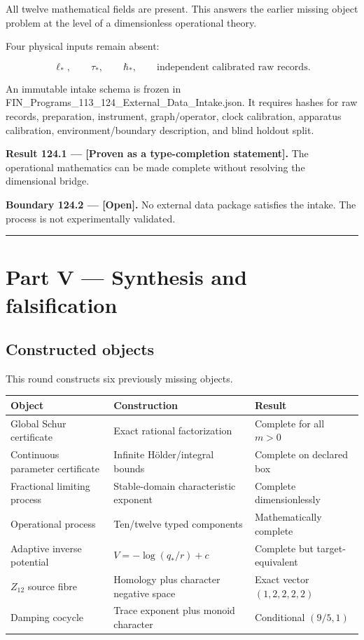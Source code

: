 \documentclass[11pt,a4paper,openany]{report}
\newcommand{\statusOpen}{\textcolor{finviolet}{[Open]}}
\begin{document}
All twelve mathematical fields are present. This answers the earlier missing object problem at the level of a dimensionless operational theory.

Four physical inputs remain absent:

\[
\ell_*,
\qquad
\tau_*,
\qquad
\hbar_*,
\qquad
\text{independent calibrated raw records}.
\]

An immutable intake schema is frozen in FIN\_Programs\_113\_124\_External\_Data\_Intake.json. It requires hashes for raw records, preparation, instrument, graph/\allowbreak{}operator, clock calibration, apparatus calibration, environment/\allowbreak{}boundary description, and blind holdout split.

\textbf{Result 124.1 --- [Proven as a type-completion statement].} The operational mathematics can be made complete without resolving the dimensional bridge.

\textbf{Boundary 124.2 --- \statusOpen{}.} No external data package satisfies the intake. The process is not experimentally validated.

\par\medskip\hrule\medskip

\chapter{Part V --- Synthesis and falsification}

\section{Constructed objects}

This round constructs six previously missing objects.

\begin{center}
\begingroup\small
\setlength{\tabcolsep}{3.5pt}
\renewcommand{\arraystretch}{1.16}
\begin{longtable}{@{}p{}p{}p{}@{}}
\toprule
\textbf{Object} & \textbf{Construction} & \textbf{Result} \\
\midrule
\endhead
Global Schur certificate & Exact rational factorization & Complete for all \(m>0\) \\
Continuous parameter certificate & Infinite Hölder/\allowbreak{}integral bounds & Complete on declared box \\
Fractional limiting process & Stable-domain characteristic exponent & Complete dimensionlessly \\
Operational process & Ten/\allowbreak{}twelve typed components & Mathematically complete \\
Adaptive inverse potential & \(V=-\log(q_*/r)+c\) & Complete but target-equivalent \\
\(Z_{12}\) source fibre & Homology plus character negative space & Exact vector \((1,2,2,2,2)\) \\
Damping cocycle & Trace exponent plus monoid character & Conditional \((9/5,1)\) \\
\bottomrule
\end{longtable}
\endgroup
\end{center}
\end{document}
